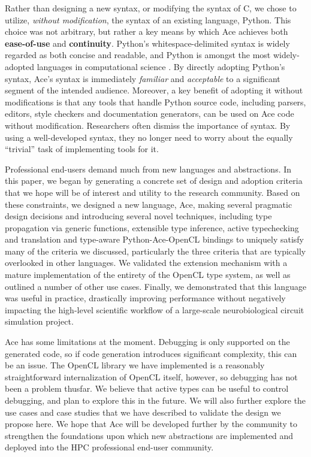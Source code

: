 \documentclass[9pt,preprint]{sigplanconf}
\begin{document}
Rather than designing a new syntax, or modifying the syntax of C, we chose to utilize, \emph{without modification}, the syntax of an existing language, Python. This choice was not arbitrary, but rather a key means by which Ace achieves both \textbf{ease-of-use} and \textbf{continuity}. Python's whitespace-delimited syntax is widely regarded as both concise and readable, and Python is amongst the most widely-adopted languages in computational science \cite{oliphant2007python}. By directly adopting Python's syntax, Ace's syntax is immediately \emph{familiar} and \emph{acceptable} to a significant segment of the intended audience. Moreover, a key benefit of adopting it without modifications is that any {tools} that handle Python source code, including parsers, editors, style checkers and documentation generators, can be used on Ace code without modification. Researchers often dismiss the importance of syntax. By using a well-developed syntax, they no longer need to worry about the equally ``trivial'' task of implementing tools for it.

Professional end-users demand much from new languages and abstractions. In this paper, we began by generating a concrete set of design and adoption criteria that we hope will be of interest and utility to the research community. Based on these constraints, we designed a new language, Ace, making several pragmatic design decisions and introducing several novel techniques, including type propagation via generic functions, extensible type inference, active typechecking and translation and type-aware Python-Ace-OpenCL bindings to uniquely satisfy many of the criteria we discussed, particularly the three criteria that are typically overlooked in other languages. We validated the extension mechanism with a mature implementation of  the entirety of the OpenCL type system, as well as outlined a number of other use cases. Finally, we demonstrated that this language was useful in practice, drastically improving performance without negatively impacting the high-level scientific workflow of a large-scale neurobiological circuit simulation project. 



Ace has some limitations at the moment. Debugging is only supported on the generated code, so if code generation introduces significant complexity, this can be an issue. The OpenCL library we have implemented is a reasonably straightforward internalization of OpenCL itself, however, so debugging has not been a problem thusfar. We believe that active types can be useful to control debugging, and plan to explore this in the future. We will also further explore the use cases and case studies that we have described to validate the design we propose here. We hope that Ace will be developed further by the community to strengthen the foundations upon which new abstractions are implemented and deployed into the HPC professional end-user community.
\end{document}
